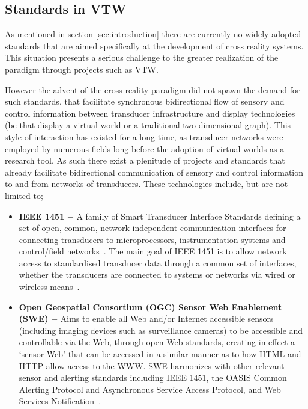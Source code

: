 \documentclass{sig-alternate}
\begin{document}
{\subsection{Standards in VTW}
\label{subsec:standards}
As mentioned in section \ref{sec:introduction} there are currently no widely adopted standards that are aimed specifically at the development of cross reality systems. This situation presents a serious challenge to the greater realization of the paradigm through projects such as VTW.

However the advent of the cross reality paradigm did not spawn the demand for such standards, that facilitate synchronous bidirectional flow of sensory and control information between transducer infrastructure and display technologies (be that display a virtual world or a traditional two-dimensional graph). This style of interaction has existed for a long time, as transducer networks were employed by numerous fields long before the adoption of virtual worlds as a research tool. As such there exist a plenitude of projects and standards that already facilitate bidirectional communication of sensory and control information to and from networks of transducers. These technologies include, but are not limited to;

\begin{itemize}

	\item{\bf{IEEE 1451}} $-$ A family of Smart Transducer Interface Standards defining a set of open, common, network-independent communication interfaces for connecting transducers to microprocessors, instrumentation systems and control/field networks~\cite{lee:standard}. The main goal of IEEE 1451 is to allow network access to standardised transducer data through a common set of interfaces, whether the transducers are connected to systems or networks via wired or wireless means~\cite{Song2008}.

	\item{\bf{Open Geospatial Consortium (OGC) Sensor Web Enablement (SWE)}} $-$ Aims to enable all Web and/or Internet accessible sensors (including imaging devices such as surveillance cameras) to be accessible and controllable via the Web, through open Web standards, creating in effect a `sensor Web' that can be accessed in a similar manner as to how HTML and HTTP allow access to the WWW. SWE harmonizes with other relevant sensor and alerting standards including IEEE 1451, the OASIS Common Alerting Protocol and Asynchronous Service Access Protocol, and Web Services Notification~\cite{Botts2008a}.


\end{itemize}}
\end{document}
